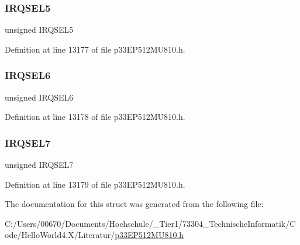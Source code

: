 \subsubsection{\texorpdfstring{I\+R\+Q\+S\+E\+L5}{IRQSEL5}}
{\footnotesize\ttfamily unsigned I\+R\+Q\+S\+E\+L5}



Definition at line 13177 of file p33\+E\+P512\+M\+U810.\+h.

\mbox{\label{structtag_d_m_a7_r_e_q_b_i_t_s_ace52408ef8c29561f3c56a3fbcbc8217}} 
\subsubsection{\texorpdfstring{I\+R\+Q\+S\+E\+L6}{IRQSEL6}}
{\footnotesize\ttfamily unsigned I\+R\+Q\+S\+E\+L6}



Definition at line 13178 of file p33\+E\+P512\+M\+U810.\+h.

\mbox{\label{structtag_d_m_a7_r_e_q_b_i_t_s_acce7dedecdf1f53cdbead3edf7c5d53a}} 
\subsubsection{\texorpdfstring{I\+R\+Q\+S\+E\+L7}{IRQSEL7}}
{\footnotesize\ttfamily unsigned I\+R\+Q\+S\+E\+L7}



Definition at line 13179 of file p33\+E\+P512\+M\+U810.\+h.



The documentation for this struct was generated from the following file\+:\begin{DoxyCompactItemize}
\item 
C\+:/\+Users/00670/\+Documents/\+Hochschule/\+\_\+\+Tier1/73304\+\_\+\+Technische\+Informatik/\+Code/\+Hello\+World4.\+X/\+Literatur/\hyperlink{p33_e_p512_m_u810_8h}{p33\+E\+P512\+M\+U810.\+h}\end{DoxyCompactItemize}
